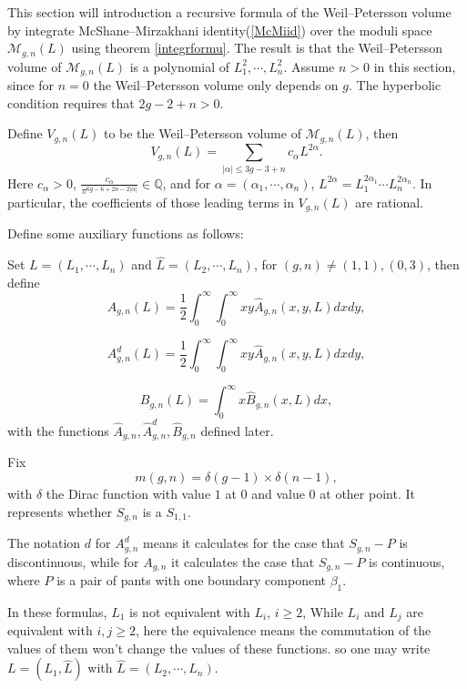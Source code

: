 This section will introduction a recursive formula of the Weil--Petersson volume by integrate McShane--Mirzakhani identity(\ref{McMiid}) over  the moduli space $\mathscr{M}_{g,n}(L)$ using theorem \ref{integrformu}. The result is that the Weil--Petersson volume of $\mathscr{M}_{g,n}(L)$ is a polynomial of $L_1^2,\cdots,L_n^2$. Assume $n>0$ in this section, since for $n=0$ the Weil--Petersson volume only depends on $g$. The hyperbolic condition requires  that $2g-2+n>0$.

\begin{theorem}\label{poly}
Define $V_{g,n}(L)$ to be the Weil--Petersson volume of $\mathscr{M}_{g,n}(L)$, then 
\begin{equation}\label{polyeq}
    V_{g,n}(L)=\sum\limits_{|\alpha|\leq 3g-3+n}c_\alpha L^{2\alpha}.
\end{equation}
Here $c_\alpha>0$, $\frac{c_\alpha}{\pi^{6g-6+2n-2|\alpha|}}\in \mathbb{Q}$, and for $\alpha=(\alpha_1,\cdots,\alpha_n)$, $L^{2\alpha}=L_1^{2\alpha_1}\cdots L_n^{2\alpha_n}$. In particular, the coefficients of those leading terms in $V_{g,n}(L)$  are rational.
\end{theorem}


Define some auxiliary functions as follows:

Set $L=(L_1,\cdots,L_n)$ and $\hat{L}=(L_2,\cdots,L_n)$, for $(g,n)\neq (1,1),(0,3)$,
then define 
\begin{equation}\label{Acon}
A_{g,n}(L)=\frac{1}{2}\int_0^\infty\int_0^\infty xy\hat{A}_{g,n}(x,y,L)dxdy,
\end{equation}

\begin{equation}\label{Adcon}
    A_{g,n}^{d}(L)=\frac{1}{2}\int_0^\infty\int_0^\infty xy\hat{A}_{g,n}(x,y,L)dxdy,
\end{equation}

\begin{equation}\label{Bfor}
    B_{g,n}(L)=\int_0^\infty x\hat{B}_{g,n}(x,L)dx,
\end{equation}
with the functions  $\hat{A}_{g,n},\hat{A}_{g,n}^{d},\hat{B}_{g,n}$ defined later.

Fix $$m(g,n)=\delta(g-1)\times \delta(n-1),$$ with $\delta$ the Dirac function with value $1$ at $0$ and value $0$ at other point. It represents whether $S_{g,n}$ is a $S_{1,1}$.

\begin{remark}
The notation $d$ for $A_{g,n}^{d}$ means  it calculates for the case that $S_{g,n}-P$  is discontinuous, while   for $A_{g,n}$ it calculates the case that $S_{g,n}-P$  is continuous, where $P$ is a pair of pants with one boundary component $\beta_1$. 

In  these formulas, $L_1$ is not equivalent with $L_i$, $i\geq 2$, While $L_i$ and $L_j$ are equivalent with $i,j\geq2$, here the equivalence means the commutation of the values of them won't change the values of these functions. so one may write $L=(L_1,\hat{L})$ with $\hat{L}=(L_2,\cdots,L_n)$.
\end{remark}

